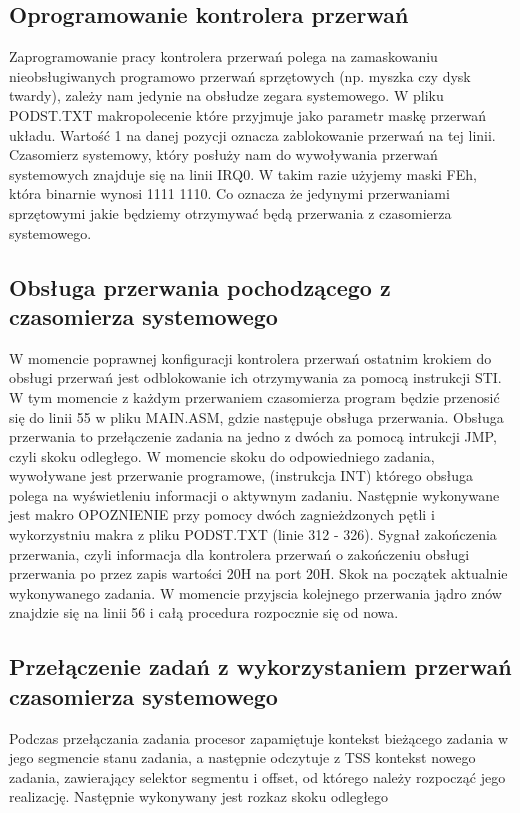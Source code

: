 \documentclass[a4paper,12pt]{article}
\begin{document}
		\subsection{Oprogramowanie kontrolera przerwań}
Zaprogramowanie pracy kontrolera przerwań polega na zamaskowaniu nieobsługiwanych programowo przerwań sprzętowych (np. myszka czy dysk twardy), zależy nam jedynie na obsłudze zegara systemowego. W pliku PODST.TXT makropolecenie które przyjmuje jako parametr maskę przerwań układu. Wartość 1 na danej pozycji oznacza zablokowanie przerwań na tej linii. Czasomierz systemowy, który posłuży nam do wywoływania przerwań systemowych znajduje się na linii IRQ0. W takim razie użyjemy maski FEh, która binarnie wynosi 1111 1110. Co oznacza że jedynymi przerwaniami sprzętowymi jakie będziemy otrzymywać będą przerwania z czasomierza systemowego.

\subsection{Obsługa przerwania pochodzącego z czasomierza systemowego}
W momencie poprawnej konfiguracji kontrolera przerwań ostatnim krokiem do obsługi przerwań jest odblokowanie ich otrzymywania za pomocą instrukcji STI. W tym momencie z każdym przerwaniem czasomierza program będzie przenosić się do linii 55 w pliku MAIN.ASM, gdzie następuje obsługa przerwania.
Obsługa przerwania to przełączenie zadania na jedno z dwóch za pomocą intrukcji JMP, czyli skoku odległego. W momencie skoku do odpowiedniego zadania, wywoływane jest przerwanie programowe, (instrukcja INT) którego obsługa polega na wyświetleniu informacji o aktywnym zadaniu. 
Następnie wykonywane jest makro OPOZNIENIE przy pomocy dwóch zagnieżdzonych pętli i wykorzystniu makra z pliku PODST.TXT (linie 312 - 326). Sygnał zakończenia przerwania, czyli informacja dla kontrolera przerwań o zakończeniu obsługi przerwania po przez zapis wartości 20H na port 20H. Skok na początek aktualnie wykonywanego zadania. W momencie przyjscia kolejnego przerwania jądro znów znajdzie się na linii 56 i całą procedura rozpocznie się od nowa. 

\subsection{Przełączenie zadań z wykorzystaniem przerwań czasomierza systemowego}

Podczas przełączania zadania procesor zapamiętuje kontekst bieżącego zadania w jego segmencie stanu zadania, a następnie odczytuje z TSS kontekst nowego zadania, zawierający selektor segmentu i offset, od którego należy rozpocząć jego realizację.  Następnie wykonywany jest rozkaz skoku odległego 
\end{document}
